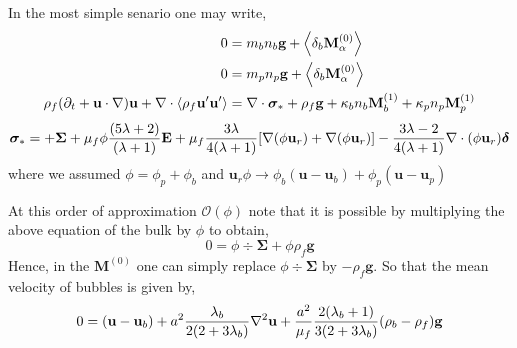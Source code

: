 \documentclass[12pt]{My_preprint}
\begin{document}
In the most simple senario one may write,
\begin{align}
    0
    &= 
    m_b n_b \textbf{g}
    + \pavg[b]{\textbf{M}^{(0)}_\alpha}
    \\
    0
    &= 
    m_p n_p \textbf{g}
    + \pavg[b]{\textbf{M}^{(0)}_\alpha}
    \\
    \rho_f (\pddt + \textbf{u} \cdot \grad)\textbf{u}
    + \div \avg{\rho_f \textbf{u}' \textbf{u}'}
    &= 
    \div \bm\sigma_*
    + \rho_f \textbf{g}
    +\kappa_b   n_b \textbf{M}_b^{(1)}
    +\kappa_p   n_p \textbf{M}_p^{(1)}
\end{align}
\begin{align*}
    \bm\sigma_*  = 
    + \bm\Sigma
    + \mu_f \phi  \frac{(5\lambda +2)}{(\lambda +1)}\textbf{E} 
    + \mu_f \frac{3\lambda}{4(\lambda +1)}[\grad (\phi \textbf{u}_r)+\grad (\phi\textbf{u}_r)] 
    - \frac{3\lambda-2}{4(\lambda+1)}\div (\phi\textbf{u}_r) \bm\delta 
\end{align*}
where we assumed $\phi = \phi_p + \phi_b$ and $\textbf{u}_r\phi \to \phi_b(\textbf{u}-\textbf{u}_b ) + \phi_p (\textbf{u}- \textbf{u}_p)$

At this order of approximation $\mathcal{O}(\phi)$ note that it is possible by multiplying the above equation of the bulk  by $\phi$ to obtain, 
\begin{equation}
    0
    = 
    \phi \div \bm\Sigma
    + \phi \rho_f \textbf{g}
\end{equation}
Hence, in the $\textbf{M}^{(0)}$ one can simply replace $\phi \div \bm\Sigma$ by $-\rho_f \textbf{g}$. 
So that the mean velocity of bubbles is given by, 
\begin{equation}
    0
    =
    (\textbf{u} - \textbf{u}_b)
    +  a^2 \frac{\lambda_b}{2(2+3\lambda_b)} \grad^2 \textbf{u}
    + \frac{a^2}{\mu_f}\frac{2(\lambda_b +1 )}{3(2+3\lambda_b)} (\rho_b - \rho_f )\textbf{g}
\end{equation}
\end{document}
